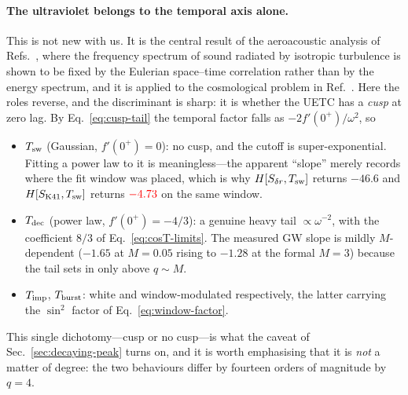 \documentclass[10pt,prd,aps,nobibnotes,superscriptaddress,preprintnumbers,notitlepage]{revtex4-1}
\newcommand{\add}[1]{{\color{red}#1}}
\newcommand{\add}[1]{#1}
\begin{document}
\paragraph{The ultraviolet belongs to the temporal axis alone.} This is not new
with us. It is the central result of the aeroacoustic analysis of
Refs.~\cite{Zhou:1996,Rubinstein:2000}, where the frequency spectrum of sound
radiated by isotropic turbulence is shown to be fixed by the Eulerian space--time
correlation rather than by the energy spectrum, and it is applied to the
cosmological problem in Ref.~\cite{Niksa:2018ofa}.
Here the roles reverse, and the discriminant is sharp: it is whether the UETC
has a \emph{cusp} at zero lag. By Eq.~\eqref{eq:cusp-tail} the temporal factor
falls as $-2f'(0^{+})/\omega^{2}$, so
\begin{itemize}\itemsep0pt
  \item $T_{\rm sw}$ (Gaussian, $f'(0^{+})=0$): no cusp, and the cutoff is
    super-exponential. Fitting a power law to it is meaningless---the apparent
    ``slope'' merely records where the fit window was placed, which is why
    $H[S_{\delta r},T_{\rm sw}]$ returns $-46.6$ and
    $H[S_{\rm K41},T_{\rm sw}]$ returns $\add{-4.73}$ on the same window.
  \item $T_{\rm dec}$ (power law, $f'(0^{+})=-4/3$): a genuine heavy tail
    $\propto\omega^{-2}$, with the coefficient $8/3$ of
    Eq.~\eqref{eq:cosT-limits}. The measured GW slope is mildly $M$-dependent
    ($-1.65$ at $M=0.05$ rising to $-1.28$ at the formal $M=3$) because the tail
    sets in only above $q\sim M$.
  \item $T_{\rm imp}$, $T_{\rm burst}$: white and window-modulated respectively,
    the latter carrying the $\sin^{2}$ factor of Eq.~\eqref{eq:window-factor}.
\end{itemize}
This single dichotomy---cusp or no cusp---is what the caveat of
Sec.~\ref{sec:decaying-peak} turns on, and it is worth emphasising that it is
\emph{not} a matter of degree: the two behaviours differ by fourteen orders of
magnitude by $q=4$.
\end{document}
